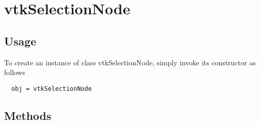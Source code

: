 \section{vtkSelectionNode}

\subsection{Usage}


To create an instance of class vtkSelectionNode, simply
invoke its constructor as follows
\begin{verbatim}
  obj = vtkSelectionNode
\end{verbatim}
\subsection{Methods}

